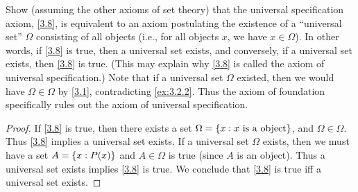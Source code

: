 \begin{ex}\label{ex:3.2.3}
  Show (assuming the other axioms of set theory) that the universal specification axiom, \cref{3.8}, is equivalent to an axiom postulating the existence of a ``universal set'' \(\Omega\) consisting of all objects (i.e., for all objects \(x\), we have \(x \in \Omega\)).
  In other words, if \cref{3.8} is true, then a universal set exists, and conversely, if a universal set exists, then \cref{3.8} is true.
  (This may explain why \cref{3.8} is called the axiom of universal specification.)
  Note that if a universal set \(\Omega\) existed, then we would have \(\Omega \in \Omega\) by \cref{3.1}, contradicting \cref{ex:3.2.2}.
  Thus the axiom of foundation specifically rules out the axiom of universal specification.
\end{ex}

\begin{proof}
  If \cref{3.8} is true, then there exists a set \(\Omega = \left\lbrace x: x \text{ is a object}\right\rbrace\), and \(\Omega \in \Omega\).
  Thus \cref{3.8} implies a universal set exists.
  If a universal set \(\Omega\) exists, then we must have a set \(A = \left\lbrace x: P(x)\right\rbrace\) and \(A \in \Omega\) is true (since \(A\) is an object).
  Thus a universal set exists implies \cref{3.8} is true.
  We conclude that \cref{3.8} is true iff a universal set exists.
\end{proof}
